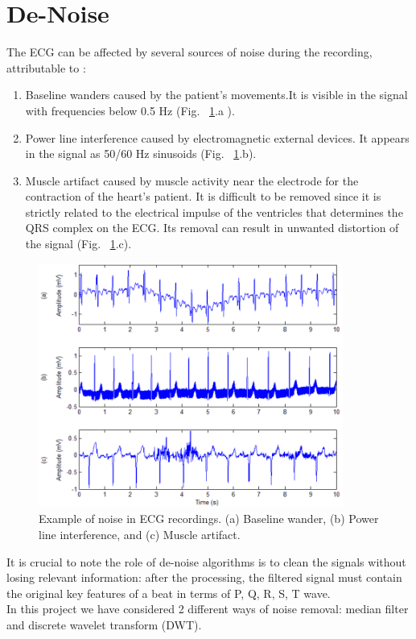 \documentclass[LaM,binding=0.6cm]{sapthesis}
\begin{document}
\section{De-Noise}
The ECG  can be affected by several sources of noise during the recording, attributable to : 
\begin{enumerate}
\item Baseline wanders caused by the patient's movements.It is visible in the signal with frequencies below 0.5 Hz (Fig. ~\ref{fig:n1}.a ).
\item Power line interference caused by electromagnetic external devices. It appears in the signal as 50/60 Hz sinusoids (Fig. ~\ref{fig:n1}.b).
\item Muscle artifact caused by muscle activity near the electrode for the contraction of the heart's patient. It is difficult to be removed since it is strictly related to the electrical impulse of the ventricles that determines the QRS complex on the ECG. Its removal can result in unwanted distortion of the signal (Fig. ~\ref{fig:n1}.c).
\end{enumerate}
\begin{figure}[H]  \centering
    \includegraphics[width=100mm,scale=0.7]{noise.png}
    \caption{Example of noise in ECG recordings. (a) Baseline wander, (b) Power line interference, and (c) Muscle artifact. \cite{noise}}
    \label{fig:n1}
\end{figure}
It is crucial to note the role of de-noise algorithms is to clean the signals without losing relevant information:  after the processing, the filtered signal must contain the original key features of a beat in terms of P, Q, R, S, T wave.\\In this project we have considered 2 different ways of noise removal: median filter and discrete wavelet transform (DWT).
\end{document}
